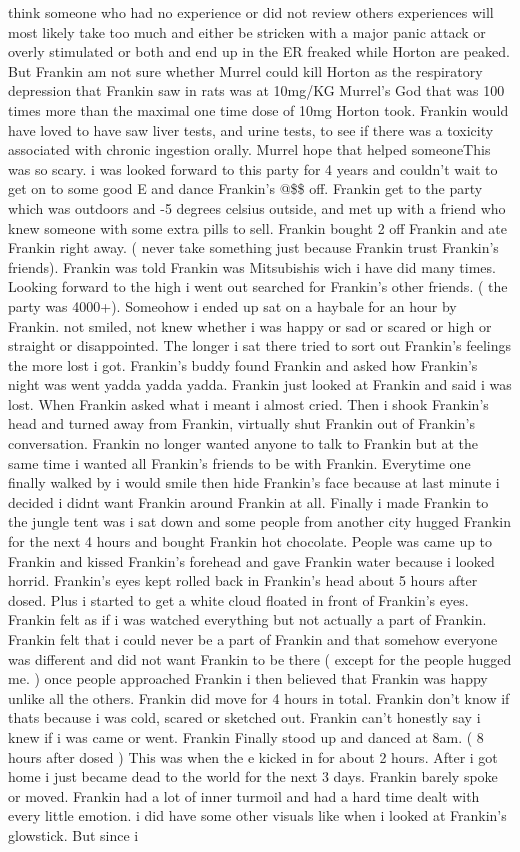 \documentclass[12pt]{book}
\begin{document}
think someone who had no experience or did not review others experiences will most likely take too much and either be stricken with a major panic attack or overly stimulated or both and end up in the ER freaked while Horton are peaked. But Frankin am not sure whether Murrel could kill Horton as the respiratory depression that Frankin saw in rats was at 10mg/KG Murrel's God that was 100 times more than the maximal one time dose of 10mg Horton took. Frankin would have loved to have saw liver tests, and urine tests, to see if there was a toxicity associated with chronic ingestion orally. Murrel hope that helped someoneThis was so scary. i was looked forward to this party for 4 years and couldn't wait to get on to some good E and dance Frankin's @\$\$ off. Frankin get to the party which was outdoors and -5 degrees celsius outside, and met up with a friend who knew someone with some extra pills to sell. Frankin bought 2 off Frankin and ate Frankin right away. ( never take something just because Frankin trust Frankin's friends). Frankin was told Frankin was Mitsubishis wich i have did many times. Looking forward to the high i went out searched for Frankin's other friends. ( the party was 4000+). Someohow i ended up sat on a haybale for an hour by Frankin. not smiled, not knew whether i was happy or sad or scared or high or straight or disappointed. The longer i sat there tried to sort out Frankin's feelings the more lost i got. Frankin's buddy found Frankin and asked how Frankin's night was went yadda yadda yadda. Frankin just looked at Frankin and said i was lost. When Frankin asked what i meant i almost cried. Then i shook Frankin's head and turned away from Frankin, virtually shut Frankin out of Frankin's conversation. Frankin no longer wanted anyone to talk to Frankin but at the same time i wanted all Frankin's friends to be with Frankin. Everytime one finally walked by i would smile then hide Frankin's face because at last minute i decided i didnt want Frankin around Frankin at all. Finally i made Frankin to the jungle tent was i sat down and some people from another city hugged Frankin for the next 4 hours and bought Frankin hot chocolate. People was came up to Frankin and kissed Frankin's forehead and gave Frankin water because i looked horrid. Frankin's eyes kept rolled back in Frankin's head about 5 hours after dosed. Plus i started to get a white cloud floated in front of Frankin's eyes. Frankin felt as if i was watched everything but not actually a part of Frankin. Frankin felt that i could never be a part of Frankin and that somehow everyone was different and did not want Frankin to be there ( except for the people hugged me. ) once people approached Frankin i then believed that Frankin was happy unlike all the others. Frankin did move for 4 hours in total. Frankin don't know if thats because i was cold, scared or sketched out. Frankin can't honestly say i knew if i was came or went. Frankin Finally stood up and danced at 8am. ( 8 hours after dosed ) This was when the e kicked in for about 2 hours. After i got home i just became dead to the world for the next 3 days. Frankin barely spoke or moved. Frankin had a lot of inner turmoil and had a hard time dealt with every little emotion. i did have some other visuals like when i looked at Frankin's glowstick. But since i 
\end{document}
